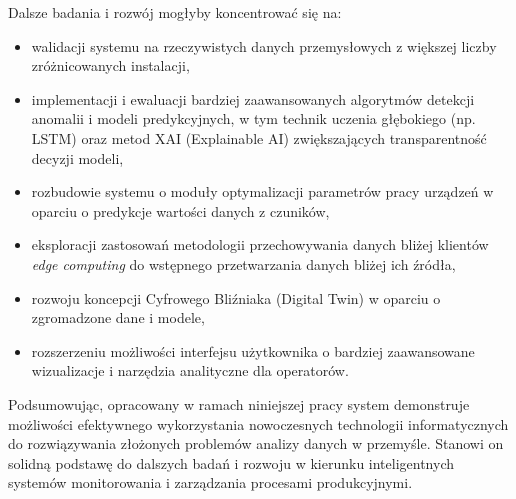 Dalsze badania i rozwój mogłyby koncentrować się na:
\begin{itemize}
    \item walidacji systemu na rzeczywistych danych przemysłowych z większej liczby zróżnicowanych instalacji,
    \item implementacji i ewaluacji bardziej zaawansowanych algorytmów detekcji anomalii i modeli predykcyjnych, w tym technik uczenia głębokiego (np. LSTM) oraz metod XAI (Explainable AI) zwiększających transparentność decyzji modeli,
    \item rozbudowie systemu o moduły optymalizacji parametrów pracy urządzeń w oparciu o predykcje wartości danych z czuników,
    \item eksploracji zastosowań metodologii przechowywania danych bliżej klientów \textit{edge computing} do wstępnego przetwarzania danych bliżej ich źródła,
    \item rozwoju koncepcji Cyfrowego Bliźniaka (Digital Twin) w oparciu o zgromadzone dane i modele,
    \item rozszerzeniu możliwości interfejsu użytkownika o bardziej zaawansowane wizualizacje i narzędzia analityczne dla operatorów.
\end{itemize}

Podsumowując, opracowany w ramach niniejszej pracy system demonstruje możliwości efektywnego wykorzystania nowoczesnych technologii informatycznych do rozwiązywania złożonych problemów analizy danych w przemyśle. Stanowi on solidną podstawę do dalszych badań i rozwoju w kierunku inteligentnych systemów monitorowania i zarządzania procesami produkcyjnymi. 